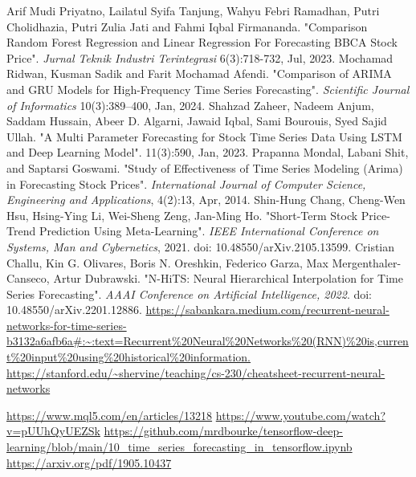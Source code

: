 \begin{thebibliography}{00}
     Arif Mudi Priyatno, Lailatul Syifa Tanjung, Wahyu Febri Ramadhan, Putri Cholidhazia, Putri Zulia Jati and Fahmi Iqbal Firmananda. "Comparison Random Forest Regression and Linear Regression For Forecasting BBCA Stock Price". \textit{Jurnal Teknik Industri Terintegrasi} 6(3):718-732, Jul, 2023.
     Mochamad Ridwan, Kusman Sadik and Farit Mochamad Afendi. "Comparison of ARIMA and GRU Models for High-Frequency Time Series Forecasting". \textit{Scientific Journal of Informatics} 10(3):389–400, Jan, 2024.
     Shahzad Zaheer, Nadeem Anjum, Saddam Hussain, Abeer D. Algarni, Jawaid Iqbal, Sami Bourouis, Syed Sajid Ullah. "A Multi Parameter Forecasting for Stock Time Series Data Using LSTM and Deep Learning Model". 11(3):590, Jan, 2023.
     Prapanna Mondal, Labani Shit, and Saptarsi Goswami. "Study of Effectiveness of Time Series Modeling (Arima) in Forecasting Stock Prices". \textit{International Journal of Computer Science, Engineering and Applications}, 4(2):13, Apr, 2014.
     Shin-Hung Chang, Cheng-Wen Hsu, Hsing-Ying Li, Wei-Sheng Zeng, Jan-Ming Ho. "Short-Term Stock Price-Trend Prediction Using Meta-Learning". \textit{IEEE International Conference on Systems, Man and Cybernetics}, 2021. doi: 10.48550/arXiv.2105.13599.
     Cristian Challu, Kin G. Olivares, Boris N. Oreshkin, Federico Garza, Max Mergenthaler-Canseco, Artur Dubrawski. "N-HiTS: Neural Hierarchical Interpolation for Time Series Forecasting". \textit{AAAI Conference on Artificial Intelligence, 2022}. doi: 10.48550/arXiv.2201.12886.
     \url{https://sabankara.medium.com/recurrent-neural-networks-for-time-series-b3132a6afb6a#:~:text=Recurrent%20Neural%20Networks%20(RNN)%20is,current%20input%20using%20historical%20information.}
     \url{https://stanford.edu/~shervine/teaching/cs-230/cheatsheet-recurrent-neural-networks}
    
     \url{https://www.mql5.com/en/articles/13218}
     \url{https://www.youtube.com/watch?v=pUUhQyUEZSk}
     \url{https://github.com/mrdbourke/tensorflow-deep-learning/blob/main/10_time_series_forecasting_in_tensorflow.ipynb}
     \url{https://arxiv.org/pdf/1905.10437}
    
    \end{thebibliography}
